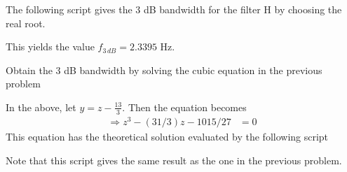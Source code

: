 %
The following script gives the 3 dB bandwidth for the filter H by choosing the 
real root.
%

%
This yields the value $f_{3\, dB} = 2.3395$ Hz.
\begin{problem}
Obtain the 3 dB bandwidth by solving the cubic equation in the previous problem
\end{problem}
%
\solution In the above, let $y = z - \frac{13}{3}$.  Then the equation becomes
\begin{align}
\Rightarrow z^3 - (31/3)z  -1015/27  & = 0
\end{align}
This equation has the theoretical solution evaluated by the following script
%

Note that this script gives the same result as the one in the previous problem.
%
